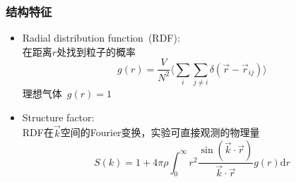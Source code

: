 \frame
{
	\frametitle{结构特征}
	\begin{itemize}
		\item \textrm{Radial distribution function~(RDF)}:\\
			在距离$r$处找到粒子的概率
			\begin{displaymath}
				g(r)=\dfrac{V}{N^2}\bigg\langle\sum_i\sum_{j\neq i}\delta(\vec r-\vec r_{ij})\bigg\rangle
			\end{displaymath}
			理想气体~$g(r)=1$
		\item \textrm{Structure factor}:\\
			\textrm{RDF}在$\vec k$空间的\textrm{Fourier}变换，实验可直接观测的物理量
			\begin{displaymath}
				S(k)=1+4\pi\rho\int_0^{\infty}r^2\dfrac{\sin(\vec k\cdot\vec r)}{\vec k\cdot\vec r}g(r)\mathrm{d}r
			\end{displaymath}
	\end{itemize}
}
